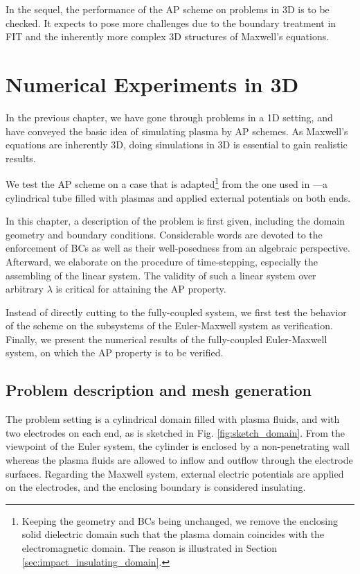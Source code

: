 \documentclass{report}
\begin{document}
In the sequel, the performance of the AP scheme on problems in 3D is to be checked. It expects to pose more challenges due to the boundary treatment in FIT and the inherently more complex 3D structures of Maxwell's equations.

\chapter{Numerical Experiments in 3D} \label{chap:numerical_experiments_in_3d}

In the previous chapter, we have gone through problems in a 1D setting, and have conveyed the basic idea of simulating plasma by AP schemes. As Maxwell's equations are inherently 3D, doing simulations in 3D is essential to gain realistic results. 

We test the AP scheme on a case that is adapted\footnote{Keeping the geometry and BCs being unchanged, we remove the enclosing solid dielectric domain such that the plasma domain coincides with the electromagnetic domain. The reason is illustrated in Section \ref{sec:impact_insulating_domain}.} from the one used in \cite[][chap. 1 sec. 4]{fuchs_2021}---a cylindrical tube filled with plasmas and applied external potentials on both ends. 

In this chapter, a description of the problem is first given, including the domain geometry and boundary conditions. Considerable words are devoted to the enforcement of BCs as well as their well-posedness from an algebraic perspective. Afterward, we elaborate on the procedure of time-stepping, especially the assembling of the linear system. The validity of such a linear system over arbitrary $\lambda$ is critical for attaining the AP property. 

Instead of directly cutting to the fully-coupled system, we first test the behavior of the scheme on the subsystems of the Euler-Maxwell system as verification. Finally, we present the numerical results of the fully-coupled Euler-Maxwell system, on which the AP property is to be verified.

\section{Problem description and mesh generation} \label{sec:problem_description}
The problem setting is a cylindrical domain filled with plasma fluids, and with two electrodes on each end, as is sketched in Fig. \ref{fig:sketch_domain}. From the viewpoint of the Euler system, the cylinder is enclosed by a non-penetrating wall whereas the plasma fluids are allowed to inflow and outflow through the electrode surfaces. Regarding the Maxwell system, external electric potentials are applied on the electrodes, and the enclosing boundary is considered insulating. 
\end{document}
